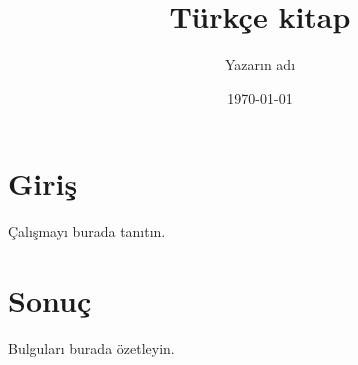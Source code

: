 \documentclass[11pt]{book}
\title{Türkçe kitap}
\author{Yazarın adı}
\date{\today}
\begin{document}
\maketitle
\tableofcontents

\chapter{Giriş}
Çalışmayı burada tanıtın.

\chapter{Sonuç}
Bulguları burada özetleyin.
\end{document}
